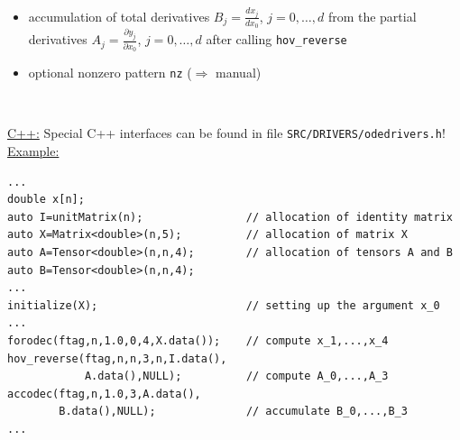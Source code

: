 \documentclass[12pt,oneside,a4paper]{article}
\begin{document}
\begin{center}
\begin{minipage}[h]{15cm}
\begin{itemize}
\item accumulation of total derivatives $B_j=\frac{d x_j}{d x_0}$,
 $j=0,\ldots,d$ from the partial derivatives 
 $A_j=\frac{\partial y_j}{\partial x_0}$, $j=0,\ldots,d$
 after calling {\tt hov\_reverse} 
\item  optional nonzero pattern {\tt nz} ($\Rightarrow$ manual)
\end{itemize}
\end{minipage}\\[4ex]
%
\begin{minipage}[h]{160mm}
\small
\underline{C++:} \hspace{0.5cm} Special C++ interfaces can be found in 
                 file {\tt SRC/DRIVERS/odedrivers.h}!\\[3ex]
\underline{Example:}
\begin{verbatim}
...
double x[n];
auto I=unitMatrix(n);                // allocation of identity matrix
auto X=Matrix<double>(n,5);          // allocation of matrix X
auto A=Tensor<double>(n,n,4);        // allocation of tensors A and B
auto B=Tensor<double>(n,n,4);
...
initialize(X);                       // setting up the argument x_0
...
forodec(ftag,n,1.0,0,4,X.data());    // compute x_1,...,x_4
hov_reverse(ftag,n,n,3,n,I.data(),
            A.data(),NULL);          // compute A_0,...,A_3
accodec(ftag,n,1.0,3,A.data(),
        B.data(),NULL);              // accumulate B_0,...,B_3
...
\end{verbatim}
\end{minipage}
%
\end{center}
\end{document}
